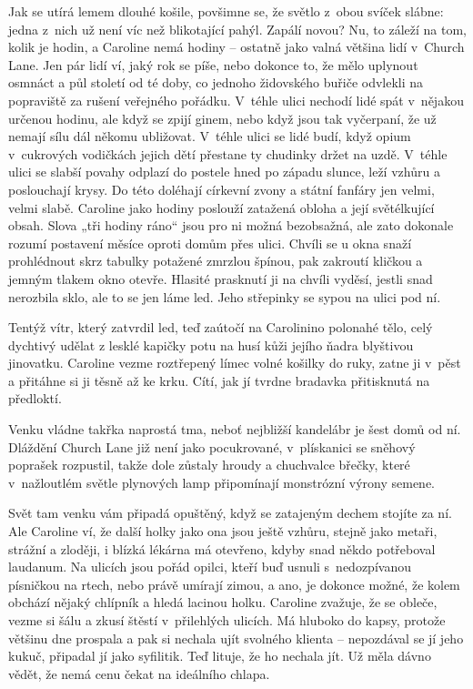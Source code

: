 Jak se utírá lemem dlouhé košile, povšimne se, že světlo z obou svíček slábne: jedna z nich už není víc než blikotající pahýl. Zapálí novou?
Nu, to záleží na tom, kolik je hodin, a Caroline nemá hodiny -- ostatně jako valná většina lidí v Church Lane. Jen pár lidí ví, jaký rok se píše, nebo dokonce to, že mělo uplynout osmnáct a půl století od té doby, co jednoho židovského buřiče odvlekli na popraviště za rušení veřejného pořádku. V téhle ulici nechodí lidé spát v nějakou určenou hodinu, ale když se zpijí ginem, nebo když jsou tak vyčerpaní, že už nemají sílu dál někomu ubližovat. V téhle ulici se lidé budí, když opium v cukrových vodičkách jejich dětí přestane ty chudinky držet na uzdě. V téhle ulici se slabší povahy odplazí do postele hned po západu slunce, leží vzhůru a poslouchají krysy. Do této doléhají církevní zvony a státní fanfáry jen velmi, velmi slabě. 
Caroline jako hodiny poslouží zatažená obloha a její světélkující obsah. Slova „tři hodiny ráno“ jsou pro ni možná bezobsažná, ale zato dokonale rozumí postavení měsíce oproti domům přes ulici. Chvíli se u okna snaží prohlédnout skrz tabulky potažené zmrzlou špínou, pak zakroutí kličkou a jemným tlakem okno otevře. Hlasité prasknutí ji na chvíli vyděsí, jestli snad nerozbila sklo, ale to se jen láme led. Jeho střepinky se sypou na ulici pod ní.

Tentýž vítr, který zatvrdil led, teď zaútočí na Carolinino polonahé tělo, celý dychtivý udělat z lesklé kapičky potu na husí kůži jejího ňadra blyštivou jinovatku. Caroline vezme roztřepený límec volné košilky do ruky, zatne ji v pěst a přitáhne si ji těsně až ke krku. Cítí, jak jí tvrdne bradavka přitisknutá na předloktí. 

Venku vládne takřka naprostá tma, neboť nejbližší kandelábr je šest domů od ní. Dláždění Church Lane již není jako pocukrované, v plískanici se sněhový poprašek rozpustil, takže dole zůstaly hroudy a chuchvalce břečky, které v nažloutlém světle plynových lamp připomínají monstrózní výrony semene.

Svět tam venku vám připadá opuštěný, když se zatajeným dechem stojíte za ní. Ale Caroline ví, že další holky jako ona jsou ještě vzhůru, stejně jako metaři, strážní a zloději, i blízká lékárna má otevřeno, kdyby snad někdo potřeboval laudanum. Na ulicích jsou pořád opilci, kteří buď usnuli s nedozpívanou písničkou na rtech, nebo právě umírají zimou, a ano, je dokonce možné, že kolem obchází nějaký chlípník a hledá lacinou holku.
Caroline zvažuje, že se obleče, vezme si šálu a zkusí štěstí v přilehlých ulicích. Má hluboko do kapsy, protože většinu dne prospala a pak si nechala ujít svolného klienta -- nepozdával se jí jeho kukuč, připadal jí jako syfilitik. Teď lituje, že ho nechala jít. Už měla dávno vědět, že nemá cenu čekat na ideálního chlapa.

